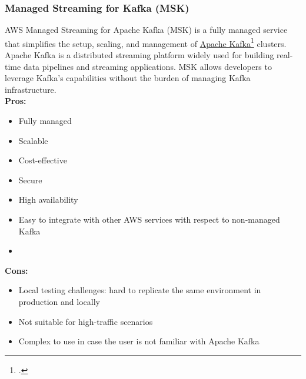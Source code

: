        \subsubsection{Managed Streaming for Kafka (MSK)}
        \label{aws:msk}
 AWS Managed Streaming for Apache Kafka (MSK) is a fully managed service that simplifies the setup, scaling, and management of \href{https://kafka.apache.org/}{Apache Kafka}\footcite{site:apache-kafka} clusters. Apache Kafka is a distributed streaming platform widely used for building real-time data pipelines and streaming applications. MSK allows developers to leverage Kafka's capabilities without the burden of managing Kafka infrastructure.\\
        \textbf{Pros:}
        \begin{itemize}
            \item Fully managed
            \item Scalable
            \item Cost-effective
            \item Secure
            \item High availability
            \item Easy to integrate with other AWS services with respect to non-managed Kafka   
            \item 
        \end{itemize}
        \textbf{Cons:}
        \begin{itemize}
            \item Local testing challenges: hard to replicate the same environment in production and locally
            \item Not suitable for high-traffic scenarios
            \item Complex to use in case the user is not familiar with Apache Kafka
        \end{itemize}

